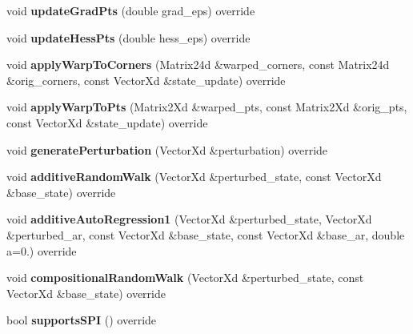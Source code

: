 \begin{DoxyCompactItemize}
\item 
\hypertarget{classSimilitude_a740ba636908f7b71547572c2526ae8b5}{void {\bfseries update\-Grad\-Pts} (double grad\-\_\-eps) override}\label{classSimilitude_a740ba636908f7b71547572c2526ae8b5}

\item 
\hypertarget{classSimilitude_a5f93e3fd32d93f7ee32bc173a8123eea}{void {\bfseries update\-Hess\-Pts} (double hess\-\_\-eps) override}\label{classSimilitude_a5f93e3fd32d93f7ee32bc173a8123eea}

\item 
\hypertarget{classSimilitude_a58fd5012312bb062368b051d3a256374}{void {\bfseries apply\-Warp\-To\-Corners} (Matrix24d \&warped\-\_\-corners, const Matrix24d \&orig\-\_\-corners, const Vector\-Xd \&state\-\_\-update) override}\label{classSimilitude_a58fd5012312bb062368b051d3a256374}

\item 
\hypertarget{classSimilitude_aceaf014c4f848b0b3743290cb06ed55e}{void {\bfseries apply\-Warp\-To\-Pts} (Matrix2\-Xd \&warped\-\_\-pts, const Matrix2\-Xd \&orig\-\_\-pts, const Vector\-Xd \&state\-\_\-update) override}\label{classSimilitude_aceaf014c4f848b0b3743290cb06ed55e}

\item 
\hypertarget{classSimilitude_a0dfa54fb8ae916ac219e3a13f89f63ac}{void {\bfseries generate\-Perturbation} (Vector\-Xd \&perturbation) override}\label{classSimilitude_a0dfa54fb8ae916ac219e3a13f89f63ac}

\item 
\hypertarget{classSimilitude_a6fa23175cfe675313bb14784f21dfee2}{void {\bfseries additive\-Random\-Walk} (Vector\-Xd \&perturbed\-\_\-state, const Vector\-Xd \&base\-\_\-state) override}\label{classSimilitude_a6fa23175cfe675313bb14784f21dfee2}

\item 
\hypertarget{classSimilitude_a3f3672a6446bd2c8ad23c3daca60e796}{void {\bfseries additive\-Auto\-Regression1} (Vector\-Xd \&perturbed\-\_\-state, Vector\-Xd \&perturbed\-\_\-ar, const Vector\-Xd \&base\-\_\-state, const Vector\-Xd \&base\-\_\-ar, double a=0.) override}\label{classSimilitude_a3f3672a6446bd2c8ad23c3daca60e796}

\item 
\hypertarget{classSimilitude_a9e6d14d4700942f0e616fe3cb9d5471b}{void {\bfseries compositional\-Random\-Walk} (Vector\-Xd \&perturbed\-\_\-state, const Vector\-Xd \&base\-\_\-state) override}\label{classSimilitude_a9e6d14d4700942f0e616fe3cb9d5471b}

\item 
\hypertarget{classSimilitude_a4adf9107de454ab65ef8e21c09bebe40}{bool {\bfseries supports\-S\-P\-I} () override}\label{classSimilitude_a4adf9107de454ab65ef8e21c09bebe40}

\end{DoxyCompactItemize}
